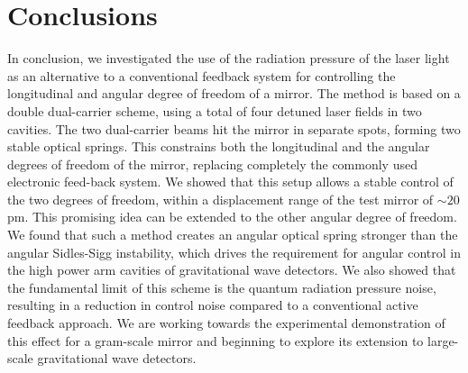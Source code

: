 \documentclass[%
 reprint,
 amsmath,amssymb,
 aps,
]{revtex4-1}
\begin{document}
\section{Conclusions}
In conclusion, we investigated the use of the radiation pressure of the laser light as an alternative to a conventional feedback system for controlling the 
longitudinal and angular degree of freedom of a mirror.
The method is based on a double dual-carrier scheme, using a total of four detuned laser fields in two cavities. 
The two dual-carrier beams hit the mirror in separate spots, forming two stable optical springs.
This constrains both the longitudinal and the angular degrees of freedom of the mirror, replacing completely the commonly used electronic feed-back system.
We showed that this setup allows a stable control of the two degrees of freedom, within a displacement range of the test mirror of $\sim 20\,$pm. This promising idea can be extended to the other angular degree of freedom.
We found that such a method creates an angular optical spring stronger than the angular Sidles-Sigg instability, which drives the requirement for angular control in the high power arm cavities of gravitational wave detectors. We also showed that the fundamental limit of this scheme is the quantum radiation pressure noise, resulting in a reduction in control noise compared to a conventional active feedback approach. 
We are working towards the experimental demonstration of this effect for a gram-scale mirror and beginning to explore its extension
to large-scale gravitational wave detectors.
\end{document}
